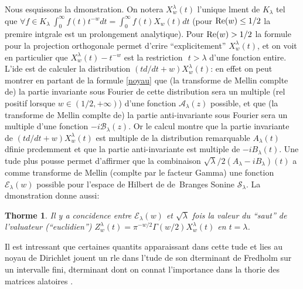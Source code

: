 \documentclass[11pt]{amsart}
\newtheorem{theoreme}{Thorme}[]
\theoremstyle{definition}
\newcommand\cA{{\mathcal A}}
\newcommand\cB{{\mathcal B}}
\newcommand\cE{{\mathcal E}}
\newcommand\cS{{\mathcal S}}
\renewcommand{\Re}{{\rm Re}}
\let\la=\lambda
\begin{document}
Nous esquissons la dmonstration. On notera $X_w^\la(t)$ l'unique
lment de $K_\la$ tel que $\forall f\in K_\la\ \int_0^\infty
f(t)t^{-w}dt = \int_0^\infty f(t)X_w(t)dt$ (pour $\Re(w)\leq 1/2$ la
premire intgrale est un prolongement analytique). Pour $\Re(w)>1/2$
la formule pour la projection orthogonale permet d'crire
``explicitement'' $X_w^\la(t)$, et on voit en particulier que
$X_w^\la(t)- t^{-w}$ est la restriction  $t>\la$ d'une fonction
entire. L'ide est de calculer la distribution $(td/dt +
w)X_w^\la(t)$: en effet on peut montrer en partant de la formule
\ref{noyau} que (la transforme de Mellin complte de) la partie
invariante sous Fourier de cette distribution sera un multiple (rel
positif lorsque $w\in(1/2,+\infty)$) d'une fonction $\cA_\la(z)$
possible, et que (la transforme de Mellin complte de) la partie
anti-invariante sous Fourier sera un multiple d'une fonction
$-i\cB_\la(z)$.  Or le calcul montre que la partie invariante de
$(td/dt + w)X_w^\la(t)$ est multiple de la distribution remarquable
$A_\la(t)$ dfinie prcdemment et que la partie anti-invariante est
multiple de $-iB_\la(t)$. Une tude plus pousse permet d'affirmer que
la combinaison $\sqrt{\la}/2 (A_\la - iB_\la)(t)$ a comme transforme
de Mellin (complte par le facteur Gamma) une fonction $\cE_\la(w)$
possible pour l'espace de Hilbert de de~Branges Sonine $\cS_\la$. La
dmonstration donne aussi:

\begin{theoreme}
Il y a concidence entre $\cE_\la(w)$ et $\sqrt{\la}$ fois la valeur
du ``saut'' de l'valuateur (``euclidien'') $Z_w^\la(t) =
\pi^{-w/2}\Gamma(w/2)X_w^\la(t)$ en $t= \la$.
\end{theoreme}

Il est intressant que certaines quantits apparaissant dans cette
tude et lies au noyau de Dirichlet jouent un rle dans l'tude de
son dterminant de Fredholm sur un intervalle fini, dterminant dont
on connat l'importance dans la thorie des matrices alatoires
\cite{mehta}.



\end{document}
